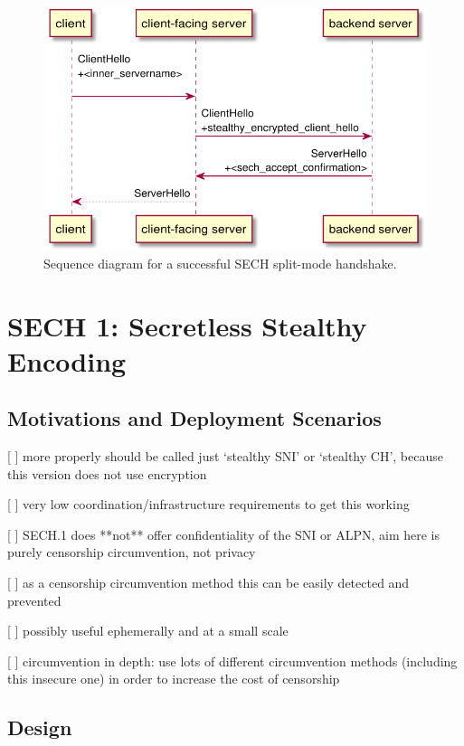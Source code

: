 \begin{figure}[htb]
\centering
\includegraphics[width=\linewidth]{figure/sech-split-mode-accept.pdf}
\captionsetup{width=.8\linewidth} 
\caption[]{Sequence diagram for a successful SECH split-mode handshake.}
\label{fig:sech-split-mode-accept}
\end{figure}

\section{SECH 1: Secretless Stealthy Encoding}
\subsection{Motivations and Deployment Scenarios}

[ ] more properly should be called just `stealthy SNI' or `stealthy CH', because this version does not use encryption

[ ] very low coordination/infrastructure requirements to get this working

[ ] SECH.1 does **not** offer confidentiality of the SNI or ALPN, aim here is purely censorship circumvention, not privacy

[ ] as a censorship circumvention method this can be easily detected and prevented

[ ] possibly useful ephemerally and at a small scale

[ ] circumvention in depth: use lots of different circumvention methods (including this insecure one) in order to increase the cost of censorship
\subsection{Design}
